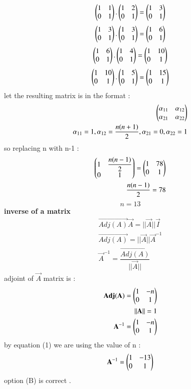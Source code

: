 \documentclass[journal,12pt,onecolumn]{IEEEtran}
\begin{document}
\\
\begin{align*}
    \begin{pmatrix}1&1\\0&1\end{pmatrix}.\begin{pmatrix}1&2\\0&1\end{pmatrix}=\begin{pmatrix}1&3\\0&1\end{pmatrix}
\end{align*}
\begin{align*}
   \begin{pmatrix}1&3\\0&1\end{pmatrix}.\begin{pmatrix}1&3\\0&1\end{pmatrix}=\begin{pmatrix}1&6\\0&1\end{pmatrix}
\end{align*}
\begin{align*}
   \begin{pmatrix}1&6\\0&1\end{pmatrix}.\begin{pmatrix}1&4\\0&1\end{pmatrix}=\begin{pmatrix}1&10\\0&1\end{pmatrix}
\end{align*}
\begin{align*}
   \begin{pmatrix}1&10\\0&1\end{pmatrix}.\begin{pmatrix}1&5\\0&1\end{pmatrix}=\begin{pmatrix}1&15\\0&1\end{pmatrix}
\end{align*}
let the resulting matrix is in the format :
\begin{align*}
    \begin{pmatrix}\alpha_{11}&\alpha_{12}\\\alpha_{21}&\alpha_{22}\end{pmatrix}
    \\
    \alpha_{11}=1,\alpha_{12}=\dfrac{n(n+1)}{2},\alpha_{21}=0,\alpha_{22}=1
\end{align*}
so replacing n with n-1 :
\begin{align*}
    \begin{pmatrix}1&\dfrac{n(n-1)}{2}\\0&1\end{pmatrix}=\begin{pmatrix}1&78\\0&1\end{pmatrix}
    \\
    \dfrac{n(n-1)}{2}=78
    \end{align*}
    \begin{equation*}
        n=13
    \end{equation*}
    \textbf{inverse of a matrix}
    \begin{align*}
        \vec{Adj(A)}\vec{A}=||\vec{A}||\vec{I}
        \\
        \vec{Adj(A)}=||\vec{A}||\vec{A}^{-1}
        \\
        \vec{A}^{-1}=\dfrac{\vec{Adj(A)}}{||\vec{A}||}
    \end{align*}
    adjoint of $\vec{A}$ matrix is :
    \begin{align*}
        \vec{Adj(A)}=\myvec{1&-n\\0&1}
        \\
        ||\Vec{A}||=1
        \\
        \vec{A}^{-1}=\myvec{1&-n\\0&1}
    \end{align*}
    by equation (1) we are using the value of n :
    \begin{align*}
        \mathbf{A}^{-1}=\begin{pmatrix}1&-13\\0&1\end{pmatrix}
    \end{align*}
    option (B) is correct .
   
  
\end{document}
